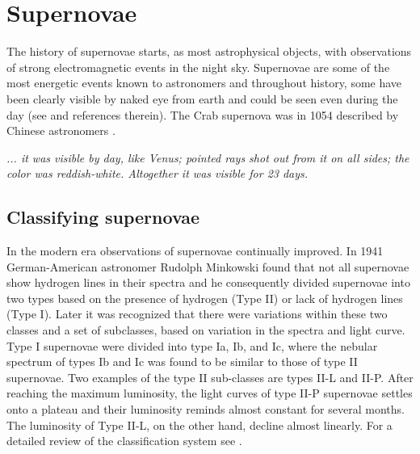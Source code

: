 

\chapter{Supernovae} \label{ch:ccsn}
The history of supernovae starts, as most astrophysical objects, with observations of strong
electromagnetic events in the night sky. Supernovae are some of the most energetic events known to astronomers and throughout history, some have been clearly visible by naked eye from earth and could be seen even during the day (see \cite{hamacher_14} and references therein). 
The Crab supernova was in 1054 described by Chinese astronomers \citep{ho_96,shen_96}. 
\begin{displayquote}
\textit{... it was visible by day, like Venus; pointed rays shot out
from it on all sides; the color was reddish-white. Altogether it
was visible for 23 days.}
\end{displayquote}
\section{Classifying supernovae}
In the modern era observations of supernovae continually improved. In 1941
German-American astronomer Rudolph Minkowski \citep{minkowski_41} found
that not all supernovae show hydrogen lines in their spectra and
he consequently divided supernovae into two types based on the
presence of hydrogen (Type II) or lack of hydrogen lines (Type I).
Later it was recognized that there were variations within these two classes
and a set of subclasses, based on variation in the spectra and light curve. 
Type I supernovae were divided into type Ia, Ib, and Ic,
where the nebular spectrum of types Ib and Ic was found to be similar to
those of type II supernovae. Two examples of the type II sub-classes are
types II-L and II-P. After reaching the maximum luminosity, the light curves of type II-P supernovae settles onto a
plateau and their luminosity reminds almost constant for several months. The luminosity of Type II-L, on the other hand, 
decline almost linearly. For a detailed review of the classification system see \cite{cappellaro_01}.

